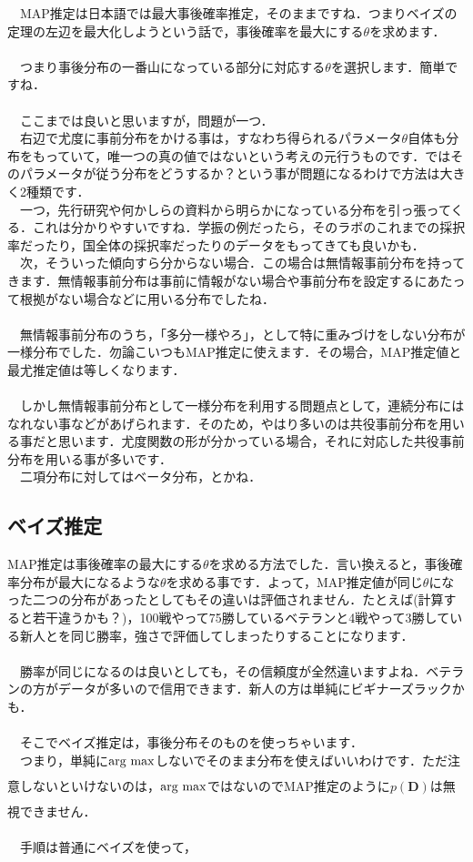 \documentclass[11pt,a4paper]{jsarticle}                    %
\newcommand{\argmax}{\mathop{\rm arg~max}\limits}
\begin{document}
　MAP推定は日本語では最大事後確率推定，そのままですね．つまりベイズの定理の左辺を最大化しようという話で，事後確率を最大にする$\theta$を求めます．\\
\\
　つまり事後分布の一番山になっている部分に対応する$\theta$を選択します．簡単ですね．\\
\\
　ここまでは良いと思いますが，問題が一つ．\\
　右辺で尤度に事前分布をかける事は，すなわち得られるパラメータ$\theta$自体も分布をもっていて，唯一つの真の値ではないという考えの元行うものです．ではそのパラメータが従う分布をどうするか？という事が問題になるわけで方法は大きく2種類です．\\
　一つ，先行研究や何かしらの資料から明らかになっている分布を引っ張ってくる．これは分かりやすいですね．学振の例だったら，そのラボのこれまでの採択率だったり，国全体の採択率だったりのデータをもってきても良いかも．\\
　次，そういった傾向すら分からない場合．この場合は無情報事前分布を持ってきます．無情報事前分布は事前に情報がない場合や事前分布を設定するにあたって根拠がない場合などに用いる分布でしたね．\\
\\
　無情報事前分布のうち，「多分一様やろ」，として特に重みづけをしない分布が一様分布でした．勿論こいつもMAP推定に使えます．その場合，MAP推定値と最尤推定値は等しくなります．\\
\\
　しかし無情報事前分布として一様分布を利用する問題点として，連続分布にはなれない事などがあげられます．そのため，やはり多いのは共役事前分布を用いる事だと思います．尤度関数の形が分かっている場合，それに対応した共役事前分布を用いる事が多いです．\\
　二項分布に対してはベータ分布，とかね．

\subsection{ベイズ推定}
MAP推定は事後確率の最大にする$\theta$を求める方法でした．言い換えると，事後確率分布が最大になるような$\theta$を求める事です．よって，MAP推定値が同じ$\theta$になった二つの分布があったとしてもその違いは評価されません．たとえば(計算すると若干違うかも？)，100戦やって75勝しているベテランと4戦やって3勝している新人とを同じ勝率，強さで評価してしまったりすることになります．\\
\\
　勝率が同じになるのは良いとしても，その信頼度が全然違いますよね．ベテランの方がデータが多いので信用できます．新人の方は単純にビギナーズラックかも．\\
\\
　そこでベイズ推定は，事後分布そのものを使っちゃいます．\\
　つまり，単純に$\argmax_{}$しないでそのまま分布を使えばいいわけです．ただ注意しないといけないのは，$\argmax_{}$ではないのでMAP推定のように$p(\mathbf{D})$は無視できません．\\
\\
　手順は普通にベイズを使って，
\end{document}
